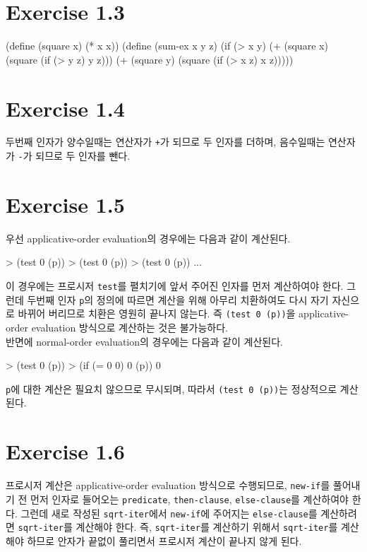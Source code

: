 \section{Exercise 1.3}
\begin{lisp}
(define (square x) (* x x))
(define (sum-ex x y z)
  (if (> x y)
      (+ (square x) (square (if (> y z) y z)))
      (+ (square y) (square (if (> x z) x z)))))
\end{lisp}

\section{Exercise 1.4}
두번째 인자가 양수일때는 연산자가 \texttt{+}가 되므로 두 인자를 더하며,
음수일때는 연산자가 \texttt{-}가 되므로 두 인자를 뺀다.

\section{Exercise 1.5}
우선 applicative-order evaluation의 경우에는 다음과 같이 계산된다.
\begin{lisp}
> (test 0 (p))
> (test 0 (p))
> (test 0 (p))
  ...
\end{lisp}
이 경우에는 프로시저 \texttt{test}를 펼치기에 앞서 주어진 인자를 먼저 계산하여야
한다. 그런데 두번째 인자 \texttt{p}의 정의에 따르면 계산을 위해 아무리
치환하여도 다시 자기 자신으로 바뀌어 버리므로 치환은 영원히 끝나지 않는다. 즉
\texttt{(test 0 (p))}을 applicative-order evaluation 방식으로 계산하는 것은
불가능하다.\\

반면에 normal-order evaluation의 경우에는 다음과 같이 계산된다.
\begin{lisp}
> (test 0 (p))
> (if (= 0 0)
      0
      (p))
0
\end{lisp}
\texttt{p}에 대한 계산은 필요치 않으므로 무시되며, 따라서 \texttt{(test 0
  (p))}는 정상적으로 계산된다.

\section{Exercise 1.6}

 프로시저 계산은 applicative-order evaluation 방식으로 수행되므로,
\texttt{new-if}를 풀어내기 전 먼저 인자로 들어오는 \texttt{predicate},
\texttt{then-clause}, \texttt{else-clause}를 계산하여야 한다. 그런데 새로
작성된 \texttt{sqrt-iter}에서 \texttt{new-if}에 주어지는
\texttt{else-clause}를 계산하려면 \texttt{sqrt-iter}를 계산해야 한다. 즉,
\texttt{sqrt-iter}를 계산하기 위해서 \texttt{sqrt-iter}를 계산해야 하므로
안자가 끝없이 풀리면서 프로시저 계산이 끝나지 않게 된다.\\

